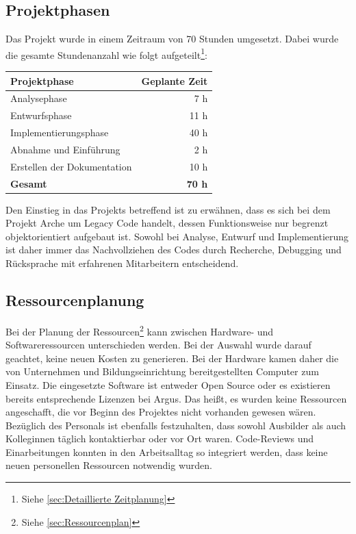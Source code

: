 \documentclass[11pt,toc=sectionentrywithoutdots, 
headheight=44pt, headings=optiontoheadandtoc, hyperfootnotes=false, hypertexnames=false]{scrartcl}
\newcommand\extendedref[1]{Siehe \ref{#1}}
\begin{document}
\subsection{Projektphasen}
Das Projekt wurde in einem Zeitraum von 70 Stunden umgesetzt. Dabei wurde die gesamte Stundenanzahl wie folgt aufgeteilt\footnote{\extendedref{sec:Detaillierte Zeitplanung}}:\newline

\begin{table}[ht]
	\begin{center}
		\begin{tabular}{ ||l|r|| }
			\hline
			\textbf{Projektphase} 		& \textbf{Geplante Zeit} \\
			\hline

			Analysephase 				& 7 h	 		\\
			Entwurfsphase				& 11 h	 		\\
			Implementierungsphase 		& 40 h	 		\\
			Abnahme und Einführung		& 2 h 			\\
			Erstellen der Dokumentation & 10 h 			\\
			\hline
			\textbf{Gesamt}	 			& \textbf{70 h}	\\
			
			\hline
		\end{tabular}
	\end{center}
\end{table}%
Den Einstieg in das Projekts betreffend ist zu erwähnen, dass es sich bei dem Projekt Arche um \gls{Legacy Code} handelt, dessen Funktionsweise nur begrenzt objektorientiert aufgebaut ist. Sowohl bei Analyse, Entwurf und Implementierung ist daher immer das Nachvollziehen des Codes durch Recherche, Debugging und Rücksprache mit erfahrenen Mitarbeitern entscheidend.

\subsection{Ressourcenplanung}
Bei der Planung der Ressourcen\footnote{\extendedref{sec:Ressourcenplan}} kann zwischen Hardware- und Softwareressourcen unterschieden werden. Bei der Auswahl wurde darauf geachtet, keine neuen Kosten zu generieren. Bei der Hardware kamen daher die von Unternehmen und Bildungseinrichtung bereitgestellten Computer zum Einsatz. Die eingesetzte Software ist entweder \gls{Open Source} oder es existieren bereits entsprechende Lizenzen bei Argus. Das heißt, es wurden keine Ressourcen angeschafft, die vor Beginn des Projektes nicht vorhanden gewesen wären. Bezüglich des Personals ist ebenfalls festzuhalten, dass sowohl Ausbilder als auch Kolleginnen täglich kontaktierbar oder vor Ort waren. Code-Reviews und Einarbeitungen konnten in den Arbeitsalltag so integriert werden, dass keine neuen personellen Ressourcen notwendig wurden.
\end{document}
